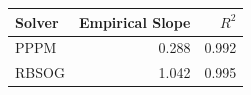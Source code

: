 \begin{tabular}{lrr}
\toprule
Solver & Empirical Slope & $R^2$ \\
\midrule
PPPM & 0.288 & 0.992 \\
RBSOG & 1.042 & 0.995 \\
\bottomrule
\end{tabular}
